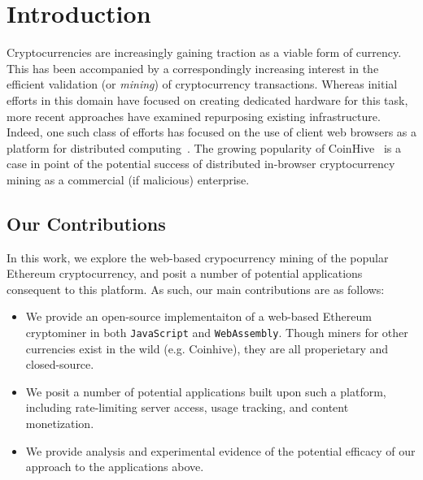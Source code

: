 \documentclass[runningheads]{llncs}
\begin{document}
\section{Introduction}
Cryptocurrencies are increasingly gaining traction as a viable form of currency.  This has been accompanied by a correspondingly increasing interest in the efficient validation (or \emph{mining}) of cryptocurrency transactions.  Whereas initial efforts in this domain have focused on creating dedicated hardware for this task, %
more recent approaches have examined repurposing existing infrastructure.  Indeed, one such class of efforts has focused on the use of client web browsers as a platform for distributed computing~\cite{Cushing}. The growing popularity of CoinHive~\cite{coinhive} is a case in point of the potential success of distributed in-browser cryptocurrency mining as a commercial (if malicious) enterprise.

\subsection{Our Contributions}
In this work, we explore the web-based crypocurrency mining of the popular Ethereum cryptocurrency, %
and posit a number of potential applications consequent to this platform.  As such, our main contributions are as follows:
\begin{itemize}
\item We provide an open-source implementaiton of a web-based Ethereum cryptominer in both \verb|JavaScript| and \verb|WebAssembly|.  Though miners for other currencies exist in the wild (e.g. Coinhive), they are all properietary and closed-source.
\item We posit a number of potential applications built upon such a platform, including rate-limiting server access, usage tracking, and content monetization.
\item We provide analysis and experimental evidence of the potential efficacy of our approach to the applications above.
\end{itemize}

\end{document}
